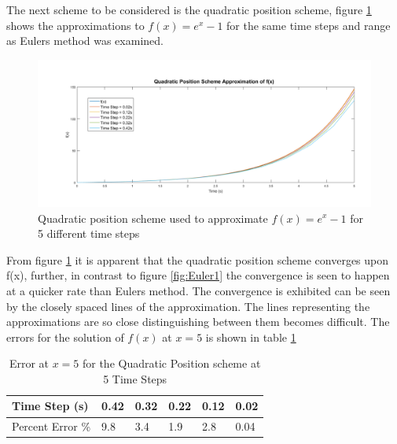 The next scheme to be considered is the quadratic position scheme, figure \ref{fig:Deriv1} shows the approximations to $f(x)=e^x-1$ for the same time steps and range as Eulers method was examined.

\begin{figure}[H]
\centering
\includegraphics[width=1.0\textwidth]{Figures/DerivativeSchemeMatlab.png}
\caption{\label{fig:Deriv1} Quadratic position scheme used to approximate $f(x)=e^x-1$ for 5 different time steps}
\end{figure} 

From figure \ref{fig:Deriv1} it is apparent that the quadratic position scheme converges upon f(x), further, in contrast to figure \ref{fig:Euler1} the convergence is seen to happen at a quicker rate than Eulers method. The convergence is exhibited can be seen by the closely spaced lines of the approximation. The lines representing the approximations are so close distinguishing between them becomes difficult. The errors for the solution of $f(x)$ at $x=5$ is shown in table \ref{tab:DerivError}

\begin{table}[H]
\centering
\label{tab:DerivError}
\begin{tabular}{llllll}
\multicolumn{1}{l|}{Time Step (s)}    & 0.42 & 0.32 & 0.22 & 0.12 & 0.02 \\ \hline
\multicolumn{1}{l|}{Percent Error \%} & 9.8  & 3.4  & 1.9  & 2.8  & 0.04 
\end{tabular}
\caption{Error at $x=5$ for the Quadratic Position scheme at 5 Time Steps}
\end{table}

